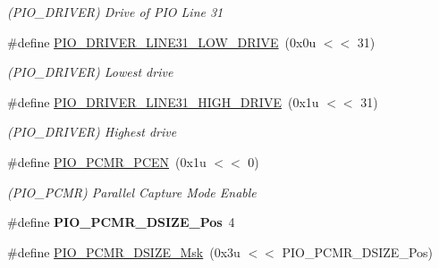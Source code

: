 \begin{DoxyCompactItemize}
\begin{DoxyCompactList}\small\item\em (P\+I\+O\+\_\+\+D\+R\+I\+V\+ER) Drive of P\+IO Line 31 \end{DoxyCompactList}\item 
\mbox{\label{group__SAMV71__PIO_ga0f5d8315c7015643fdf5877319b0c4db}} 
\#define \mbox{\hyperlink{group__SAMV71__PIO_ga0f5d8315c7015643fdf5877319b0c4db}{P\+I\+O\+\_\+\+D\+R\+I\+V\+E\+R\+\_\+\+L\+I\+N\+E31\+\_\+\+L\+O\+W\+\_\+\+D\+R\+I\+VE}}~(0x0u $<$$<$ 31)
\begin{DoxyCompactList}\small\item\em (P\+I\+O\+\_\+\+D\+R\+I\+V\+ER) Lowest drive \end{DoxyCompactList}\item 
\mbox{\label{group__SAMV71__PIO_gaf26b819dcd145ed0e4d8e5cbc60bb22c}} 
\#define \mbox{\hyperlink{group__SAMV71__PIO_gaf26b819dcd145ed0e4d8e5cbc60bb22c}{P\+I\+O\+\_\+\+D\+R\+I\+V\+E\+R\+\_\+\+L\+I\+N\+E31\+\_\+\+H\+I\+G\+H\+\_\+\+D\+R\+I\+VE}}~(0x1u $<$$<$ 31)
\begin{DoxyCompactList}\small\item\em (P\+I\+O\+\_\+\+D\+R\+I\+V\+ER) Highest drive \end{DoxyCompactList}\item 
\mbox{\label{group__SAMV71__PIO_ga71d58c9bab76cc2366b5982453b0957a}} 
\#define \mbox{\hyperlink{group__SAMV71__PIO_ga71d58c9bab76cc2366b5982453b0957a}{P\+I\+O\+\_\+\+P\+C\+M\+R\+\_\+\+P\+C\+EN}}~(0x1u $<$$<$ 0)
\begin{DoxyCompactList}\small\item\em (P\+I\+O\+\_\+\+P\+C\+MR) Parallel Capture Mode Enable \end{DoxyCompactList}\item 
\mbox{\label{group__SAMV71__PIO_ga231159609d52aa044e7940aa2b60f6ec}} 
\#define {\bfseries P\+I\+O\+\_\+\+P\+C\+M\+R\+\_\+\+D\+S\+I\+Z\+E\+\_\+\+Pos}~4
\item 
\mbox{\label{group__SAMV71__PIO_ga2405d9e99652a4ecd89f8aae58936552}} 
\#define \mbox{\hyperlink{group__SAMV71__PIO_ga2405d9e99652a4ecd89f8aae58936552}{P\+I\+O\+\_\+\+P\+C\+M\+R\+\_\+\+D\+S\+I\+Z\+E\+\_\+\+Msk}}~(0x3u $<$$<$ P\+I\+O\+\_\+\+P\+C\+M\+R\+\_\+\+D\+S\+I\+Z\+E\+\_\+\+Pos)

\end{DoxyCompactItemize}
